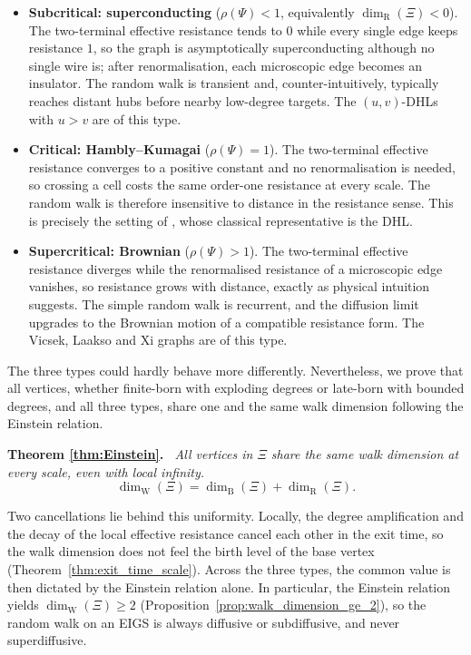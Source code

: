 \documentclass{article}
\newenvironment{restated}[1]{%
  \par\noindent\textbf{Theorem #1.}\itshape\ }%
  {\par}
\theoremstyle{plain}
\theoremstyle{definition}
\newcommand{\dimbox}{\dim_\mathrm{B}}
\newcommand{\dimwalk}{\dim_\mathrm{W}}
\newcommand{\dimresis}{\dim_\mathrm{R}}
\begin{document}
\begin{itemize}
\item \textbf{Subcritical: superconducting} ($\rho(\Psi)<1$, equivalently $\dimresis(\Xi)<0$).
The two-terminal effective resistance tends to $0$ while every single edge keeps resistance $1$, so the graph is asymptotically superconducting although no single wire is; after renormalisation, each microscopic edge becomes an insulator.
The random walk is transient and, counter-intuitively, typically reaches distant hubs before nearby low-degree targets.
The $(u,v)$-DHLs with $u>v$ are of this type.
\item \textbf{Critical: Hambly--Kumagai} ($\rho(\Psi)=1$).
The two-terminal effective resistance converges to a positive constant and no renormalisation is needed, so crossing a cell costs the same order-one resistance at every scale.
The random walk is therefore insensitive to distance in the resistance sense.
This is precisely the setting of \cite{hambly2010diffusion}, whose classical representative is the DHL.
\item \textbf{Supercritical: Brownian} ($\rho(\Psi)>1$).
The two-terminal effective resistance diverges while the renormalised resistance of a microscopic edge vanishes, so resistance grows with distance, exactly as physical intuition suggests.
The simple random walk is recurrent, and the diffusion limit upgrades to the Brownian motion of a compatible resistance form.
The Vicsek, Laakso and Xi graphs are of this type.
\end{itemize}

The three types could hardly behave more differently.
Nevertheless, we prove that all vertices, whether finite-born with exploding degrees or late-born with bounded degrees, and all three types, share one and the same walk dimension following the Einstein relation.

\begin{restated}{\ref{thm:Einstein}}
All vertices in $\Xi$ share the same walk dimension at every scale, even with local infinity.
\[
\dimwalk(\Xi)=\dimbox(\Xi)+\dimresis(\Xi).
\]
\end{restated}

Two cancellations lie behind this uniformity.
Locally, the degree amplification and the decay of the local effective resistance cancel each other in the exit time, so the walk dimension does not feel the birth level of the base vertex (Theorem~\ref{thm:exit_time_scale}).
Across the three types, the common value is then dictated by the Einstein relation alone.
In particular, the Einstein relation yields $\dimwalk(\Xi)\ge 2$ (Proposition~\ref{prop:walk_dimension_ge_2}), so the random walk on an EIGS is always diffusive or subdiffusive, and never superdiffusive.
\end{document}
